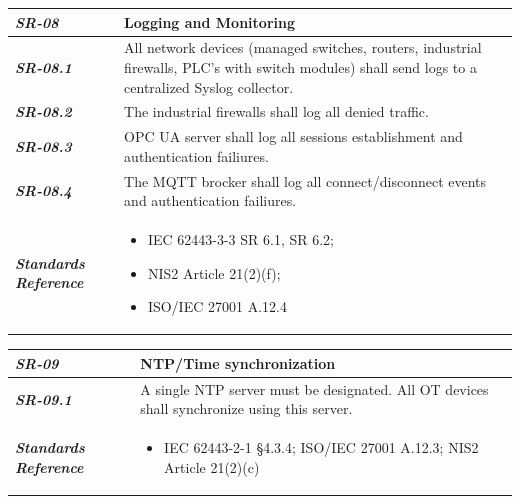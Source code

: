 \documentclass{article}
\begin{document}
\begin{tabularx}{\textwidth}{>{\bfseries}p{2.5cm} X}
    \textit{SR-08} & \textbf{Logging and Monitoring} \vspace{0.5em}\\
\toprule
\textit{SR-08.1} &
    All network devices (managed switches, routers, industrial firewalls, PLC's with switch modules) shall send logs to a centralized Syslog collector.
    \vspace{0.5em}
\\
\textit{SR-08.2} &
    The industrial firewalls shall log all denied traffic.
    \vspace{0.5em}
    \\
\textit{SR-08.3} &
    OPC UA server shall log all sessions establishment and authentication failiures.
    \vspace{0.5em}
    \\
\textit{SR-08.4} &
    The MQTT brocker shall log all connect/disconnect events and authentication failiures.
    \vspace{0.5em}
    \\
\midrule
    \textit{Standards Reference} &
\begin{itemize}[label=-, noitemsep, topsep=0pt, leftmargin=*]
    \item IEC 62443-3-3 SR 6.1, SR 6.2;
    \item NIS2 Article 21(2)(f); 
    \item ISO/IEC 27001 A.12.4
\end{itemize} \vspace{1em} \\ 
\end{tabularx}
\vspace{2em}

\begin{tabularx}{\textwidth}{>{\bfseries}p{2.5cm} X}
    \textit{SR-09} & \textbf{NTP/Time synchronization} \vspace{0.5em}\\
\toprule
\textit{SR-09.1} &
    A single NTP server must be designated. All OT devices shall synchronize using this server.
    \vspace{0.5em}
\\
\midrule
    \textit{Standards Reference} &
\begin{itemize}[label=-, noitemsep, topsep=0pt, leftmargin=*]
    \item IEC 62443-2-1 §4.3.4; ISO/IEC 27001 A.12.3; NIS2 Article 21(2)(c)
\end{itemize} \vspace{1em} \\ 
\end{tabularx}
\vspace{2em}
\end{document}
